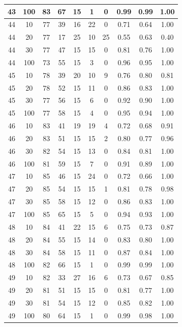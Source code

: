\begin{longtable}{ |c|c|c|c|c|c|c|c|c|c| }
            43 & 100 & 83 & 67 & 15 & 1 & 0 & 0.99 & 0.99 & 1.00 \\ \hline
            44 & 10 & 77 & 39 & 16 & 22 & 0 & 0.71 & 0.64 & 1.00 \\ \hline
            44 & 20 & 77 & 17 & 25 & 10 & 25 & 0.55 & 0.63 & 0.40 \\ \hline
            44 & 30 & 77 & 47 & 15 & 15 & 0 & 0.81 & 0.76 & 1.00 \\ \hline
            44 & 100 & 73 & 55 & 15 & 3 & 0 & 0.96 & 0.95 & 1.00 \\ \hline
            45 & 10 & 78 & 39 & 20 & 10 & 9 & 0.76 & 0.80 & 0.81 \\ \hline
            45 & 20 & 78 & 52 & 15 & 11 & 0 & 0.86 & 0.83 & 1.00 \\ \hline
            45 & 30 & 77 & 56 & 15 & 6 & 0 & 0.92 & 0.90 & 1.00 \\ \hline
            45 & 100 & 77 & 58 & 15 & 4 & 0 & 0.95 & 0.94 & 1.00 \\ \hline
            46 & 10 & 83 & 41 & 19 & 19 & 4 & 0.72 & 0.68 & 0.91 \\ \hline
            46 & 20 & 83 & 51 & 15 & 15 & 2 & 0.80 & 0.77 & 0.96 \\ \hline
            46 & 30 & 82 & 54 & 15 & 13 & 0 & 0.84 & 0.81 & 1.00 \\ \hline
            46 & 100 & 81 & 59 & 15 & 7 & 0 & 0.91 & 0.89 & 1.00 \\ \hline
            47 & 10 & 85 & 46 & 15 & 24 & 0 & 0.72 & 0.66 & 1.00 \\ \hline
            47 & 20 & 85 & 54 & 15 & 15 & 1 & 0.81 & 0.78 & 0.98 \\ \hline
            47 & 30 & 85 & 58 & 15 & 12 & 0 & 0.86 & 0.83 & 1.00 \\ \hline
            47 & 100 & 85 & 65 & 15 & 5 & 0 & 0.94 & 0.93 & 1.00 \\ \hline
            48 & 10 & 84 & 41 & 22 & 15 & 6 & 0.75 & 0.73 & 0.87 \\ \hline
            48 & 20 & 84 & 55 & 15 & 14 & 0 & 0.83 & 0.80 & 1.00 \\ \hline
            48 & 30 & 84 & 58 & 15 & 11 & 0 & 0.87 & 0.84 & 1.00 \\ \hline
            48 & 100 & 82 & 66 & 15 & 1 & 0 & 0.99 & 0.99 & 1.00 \\ \hline
            49 & 10 & 82 & 33 & 27 & 16 & 6 & 0.73 & 0.67 & 0.85 \\ \hline
            49 & 20 & 81 & 51 & 15 & 15 & 0 & 0.81 & 0.77 & 1.00 \\ \hline
            49 & 30 & 81 & 54 & 15 & 12 & 0 & 0.85 & 0.82 & 1.00 \\ \hline
            49 & 100 & 80 & 64 & 15 & 1 & 0 & 0.99 & 0.98 & 1.00 \\ \hline
\end{longtable}